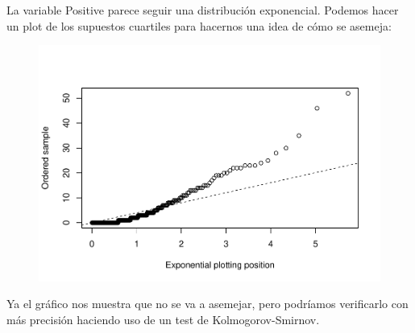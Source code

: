 \newpage

La variable Positive parece seguir una distribución exponencial. Podemos hacer un plot de los supuestos cuartiles para hacernos una idea de cómo se asemeja:









\begin{figure}[H]\includegraphics[width=.9\linewidth]{img/EDA2_files/figure-latex/unnamed-chunk-20-1} \end{figure}

Ya el gráfico nos muestra que no se va a asemejar, pero podríamos verificarlo con más precisión haciendo uso de un test de Kolmogorov-Smirnov.

